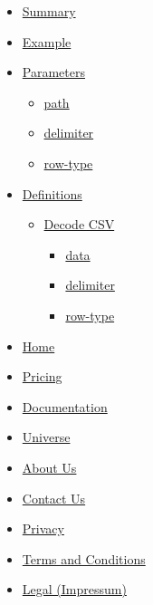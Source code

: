 \begin{itemize}
\tightlist
\item
  \hyperref[summary]{Summary}
\item
  \hyperref[example]{Example}
\item
  \hyperref[parameters]{Parameters}

  \begin{itemize}
  \tightlist
  \item
    \hyperref[parameters-path]{path}
  \item
    \hyperref[parameters-delimiter]{delimiter}
  \item
    \hyperref[parameters-row-type]{row-type}
  \end{itemize}
\item
  \hyperref[definitions]{Definitions}

  \begin{itemize}
  \tightlist
  \item
    \hyperref[definitions-decode]{Decode CSV}

    \begin{itemize}
    \tightlist
    \item
      \hyperref[definitions-decode-data]{data}
    \item
      \hyperref[definitions-decode-delimiter]{delimiter}
    \item
      \hyperref[definitions-decode-row-type]{row-type}
    \end{itemize}
  \end{itemize}
\end{itemize}

\begin{itemize}
\tightlist
\item
  \href{/}{Home}
\item
  \href{/pricing/}{Pricing}
\item
  \href{/docs/}{Documentation}
\item
  \href{/universe/}{Universe}
\item
  \href{/about/}{About Us}
\item
  \href{/contact/}{Contact Us}
\item
  \href{/privacy/}{Privacy}
\item
  \href{https://typst.app/terms}{Terms and Conditions}
\item
  \href{/legal/}{Legal (Impressum)}
\end{itemize}

